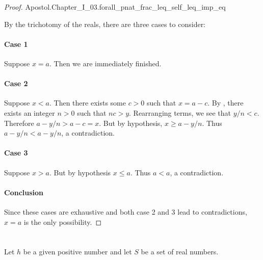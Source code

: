 \documentclass{report}
\begin{document}
\begin{proof}

    {Apostol.Chapter\_I\_03.forall\_pnat\_frac\_leq\_self\_leq\_imp\_eq}

  By the trichotomy of the reals, there are three cases to consider:

  \paragraph{Case 1}%

    Suppose $x = a$.
    Then we are immediately finished.

  \paragraph{Case 2}%

    Suppose $x < a$.
    Then there exists some $c > 0$ such that $x = a - c$.
    By , there exists an integer $n > 0$
      such that $nc > y$.
    Rearranging terms, we see that $y / n < c$.
    Therefore $a - y / n > a - c = x$.
    But by hypothesis, $x \geq a - y / n$.
    Thus $a - y / n < a - y / n$, a contradiction.

  \paragraph{Case 3}%

    Suppose $x > a$.
    But by hypothesis $x \leq a$.
    Thus $a < a$, a contradiction.

  \paragraph{Conclusion}%

    Since these cases are exhaustive and both case 2 and 3 lead to
      contradictions, $x = a$ is the only possibility.

\end{proof}

\section{}%
\label{sec:theorem-i.32}

Let $h$ be a given positive number and let $S$ be a set of real numbers.

\subsection{}%
\label{sub:theorem-i.32a}
\end{document}
